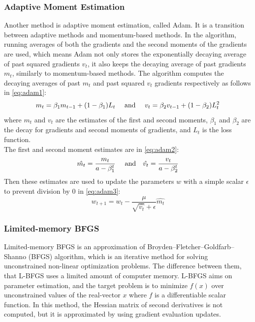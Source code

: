 \subsubsection{Adaptive Moment Estimation}

Another method is adaptive moment estimation, called Adam. It is a transition between adaptive methods and momentum-based methods. In the algorithm, running averages of both the gradients and the second moments of the gradients are used, which means Adam not only stores the exponentially decaying average of past squared gradients $v_t$, it also keeps the decaying average of past gradients $m_t$, similarly to momentum-based methods. The algorithm computes the decaying averages of past $m_t$ and past squared $v_t$ gradients respectively as follows in \eqref{eq:adam1}:
\begin{equation} m_t = \beta_1 m_{t-1} + (1-\beta_1)L_t ~~~~\hbox{and}~~~\ v_t = \beta_2 v_{t-1} + (1-\beta_2)L^2_t \label{eq:adam1} \end{equation}
where $m_t$ and $v_t$ are the estimates of the first and second moments, $\beta_1$ and $\beta_2$ are the decay for gradients and second moments of gradients, and $L_t$ is the loss function.\\
The first and second moment estimates are in \eqref{eq:adam2}:
\begin{equation} \hat{m_t} = \frac{m_t}{a-\beta^t_1} ~~~~\hbox{and}~~~ \hat{v_t} = \frac{v_t}{a-\beta^t_2} \label{eq:adam2} \end{equation}
Then these estimates are used to update the parameters $w$ with a simple scalar $\epsilon$ to prevent division by 0 in \eqref{eq:adam3}:
\begin{equation} w_{t+1} = w_t - \frac{\mu}{\sqrt{\hat{v_t}}+\epsilon}\hat{m_t} \label{eq:adam3} \end{equation}


\subsubsection{Limited-memory BFGS}

Limited-memory BFGS is an approximation of Broyden–Fletcher–Goldfarb–Shanno (BFGS) algorithm, which is an iterative method for solving unconstrained non-linear optimization problems. The difference between them, that L-BFGS uses a limited amount of computer memory. L-BFGS aims on parameter estimation, and the target problem is to minimize $f(x)$ over unconstrained values of the real-vector $x$ where $f$ is a differentiable scalar function. In this method, the Hessian matrix of second derivatives is not computed, but it is approximated by using gradient evaluation updates. \medskip

